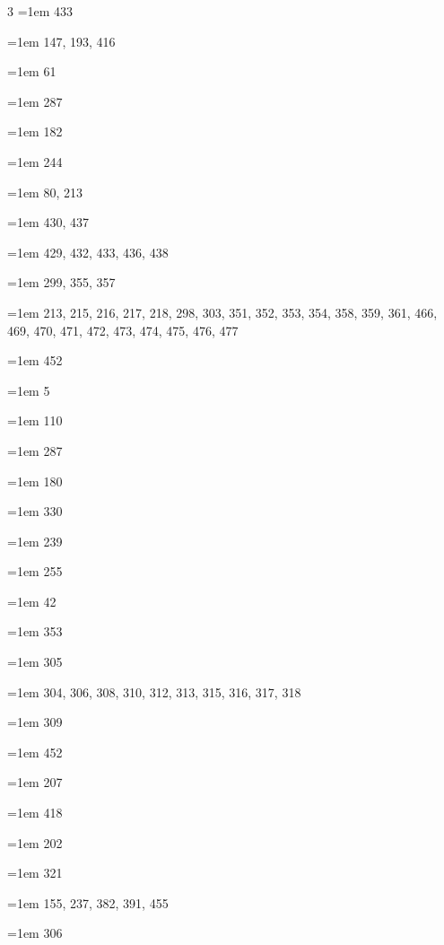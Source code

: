 \begin{multicols}{3}
\hangindent=1em  433\par
\hangindent=1em  147, 193, 416\par
\hangindent=1em  61\par
\hangindent=1em  287\par
\hangindent=1em  182\par
\hangindent=1em  244\par
\hangindent=1em  80, 213\par
\hangindent=1em  430, 437\par
\hangindent=1em  429, 432, 433, 436, 438\par
\hangindent=1em  299, 355, 357\par
\hangindent=1em  213, 215, 216, 217, 218, 298, 303, 351, 352, 353, 354, 358, 359, 361, 466, 469, 470, 471, 472, 473, 474, 475, 476, 477\par
\hangindent=1em  452\par
\hangindent=1em  5\par
\hangindent=1em  110\par
\hangindent=1em  287\par
\hangindent=1em  180\par
\hangindent=1em  330\par
\hangindent=1em  239\par
\hangindent=1em  255\par
\hangindent=1em  42\par
\hangindent=1em  353\par
\hangindent=1em  305\par
\hangindent=1em  304, 306, 308, 310, 312, 313, 315, 316, 317, 318\par
\hangindent=1em  309\par
\hangindent=1em  452\par
\hangindent=1em  207\par
\hangindent=1em  418\par
\hangindent=1em  202\par
\hangindent=1em  321\par
\hangindent=1em  155, 237, 382, 391, 455\par
\hangindent=1em  306\par

\end{multicols}
